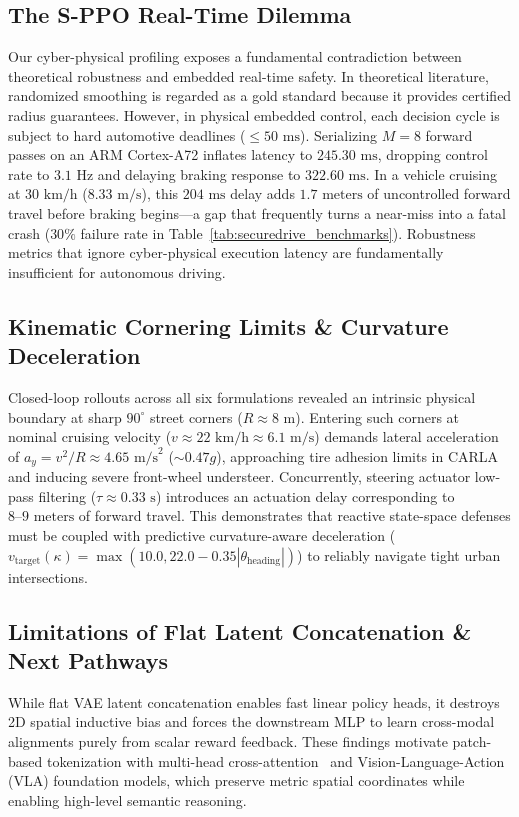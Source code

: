 \documentclass[conference]{IEEEtran}
\begin{document}
\subsection{The S-PPO Real-Time Dilemma}
Our cyber-physical profiling exposes a fundamental contradiction between theoretical robustness and embedded real-time safety. In theoretical literature, randomized smoothing is regarded as a gold standard because it provides certified radius guarantees. However, in physical embedded control, each decision cycle is subject to hard automotive deadlines ($\le 50\text{ ms}$). Serializing $M=8$ forward passes on an ARM Cortex-A72 inflates latency to $245.30\text{ ms}$, dropping control rate to $3.1\text{ Hz}$ and delaying braking response to $322.60\text{ ms}$. In a vehicle cruising at $30\text{ km/h}$ ($8.33\text{ m/s}$), this $204\text{ ms}$ delay adds $1.7\text{ meters}$ of uncontrolled forward travel before braking begins---a gap that frequently turns a near-miss into a fatal crash ($30\%$ failure rate in Table~\ref{tab:securedrive_benchmarks}). Robustness metrics that ignore cyber-physical execution latency are fundamentally insufficient for autonomous driving.

\subsection{Kinematic Cornering Limits \& Curvature Deceleration}
Closed-loop rollouts across all six formulations revealed an intrinsic physical boundary at sharp $90^\circ$ street corners ($R \approx 8\text{ m}$). Entering such corners at nominal cruising velocity ($v \approx 22\text{ km/h} \approx 6.1\text{ m/s}$) demands lateral acceleration of $a_y = v^2/R \approx 4.65\text{ m/s}^2$ ($\sim 0.47g$), approaching tire adhesion limits in CARLA and inducing severe front-wheel understeer. Concurrently, steering actuator low-pass filtering ($\tau \approx 0.33\text{ s}$) introduces an actuation delay corresponding to $8\text{--}9\text{ meters}$ of forward travel. This demonstrates that reactive state-space defenses must be coupled with predictive curvature-aware deceleration ($v_{\text{target}}(\kappa) = \max(10.0, 22.0 - 0.35|\theta_{\text{heading}}|)$) to reliably navigate tight urban intersections.

\subsection{Limitations of Flat Latent Concatenation \& Next Pathways}
While flat VAE latent concatenation enables fast linear policy heads, it destroys 2D spatial inductive bias and forces the downstream MLP to learn cross-modal alignments purely from scalar reward feedback. These findings motivate patch-based tokenization with multi-head cross-attention~\cite{transfuser2021, interfuser2022} and Vision-Language-Action (VLA) foundation models, which preserve metric spatial coordinates while enabling high-level semantic reasoning.
\end{document}
